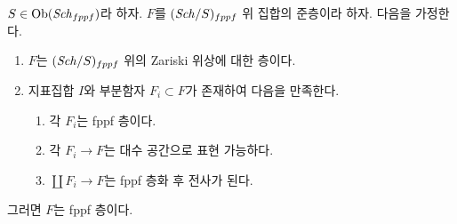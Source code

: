 \begin{lemma}
\label{lemma-glueing-sheaves}
$S \in \mathop{\mathrm{Ob}}\nolimits(\mathit{Sch}_{fppf})$라 하자. $F$를 $(\mathit{Sch}/S)_{fppf}$ 위 집합의
준층이라 하자. 다음을 가정한다.
\begin{enumerate}
\item $F$는 $(\mathit{Sch}/S)_{fppf}$ 위의 Zariski 위상에 대한 층이다.
\item 지표집합 $I$와 부분함자 $F_i \subset F$가 존재하여 다음을
만족한다.
\begin{enumerate}
\item 각 $F_i$는 fppf 층이다.
\item 각 $F_i \to F$는 대수 공간으로 표현 가능하다.
\item $\coprod F_i \to F$는 fppf 층화 후 전사가 된다.
\end{enumerate}
\end{enumerate}
그러면 $F$는 fppf 층이다.
\end{lemma}

